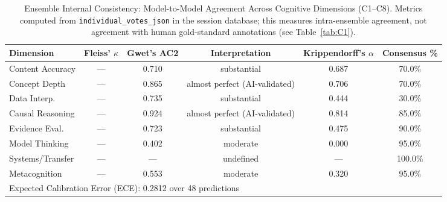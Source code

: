 \begin{table}[H]
\centering
\caption{Ensemble Internal Consistency: Model-to-Model Agreement Across Cognitive Dimensions (C1--C8). Metrics computed from \texttt{individual\_votes\_json} in the session database; this measures intra-ensemble agreement, not agreement with human gold-standard annotations (see Table~\ref{tab:C1}).}
\label{tab:ensemble-consistency}
\scriptsize
\begin{tabular}{lccccc}
\hline
Dimension & Fleiss' $\kappa$ & Gwet's AC2 & Interpretation & Krippendorff's $\alpha$ & Consensus \% \\
\hline
  Content Accuracy & --- & 0.710 & substantial & 0.687 & 70.0\% \\
  Concept Depth & --- & 0.865 & almost perfect (AI-validated) & 0.706 & 70.0\% \\
  Data Interp. & --- & 0.735 & substantial & 0.444 & 30.0\% \\
  Causal Reasoning & --- & 0.924 & almost perfect (AI-validated) & 0.814 & 85.0\% \\
  Evidence Eval. & --- & 0.723 & substantial & 0.475 & 90.0\% \\
  Model Thinking & --- & 0.402 & moderate & 0.000 & 95.0\% \\
  Systems/Transfer & --- & --- & undefined & --- & 100.0\% \\
  Metacognition & --- & 0.553 & moderate & 0.320 & 95.0\% \\
\hline
  \multicolumn{6}{l}{Expected Calibration Error (ECE): 0.2812 over 48 predictions} \\
\hline
\end{tabular}
\end{table}